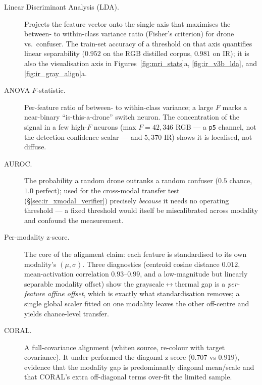 \documentclass[12pt,a4paper,oneside,openright]{book}
\begin{document}
\begin{description}
    \item[Linear Discriminant Analysis (LDA).] Projects the feature vector onto the single axis that maximises the between- to within-class variance ratio (Fisher's criterion) for drone vs.\ confuser. The train-set accuracy of a threshold on that axis quantifies linear separability ($0.952$ on the RGB distilled corpus, $0.981$ on IR); it is also the visualisation axis in Figures~\ref{fig:mri_stats}a, \ref{fig:ir_v3b_lda}, and \ref{fig:ir_gray_align}a.
    \item[ANOVA $F$-statistic.] Per-feature ratio of between- to within-class variance; a large $F$ marks a near-binary ``is-this-a-drone'' switch neuron. The concentration of the signal in a few high-$F$ neurons (max $F=42{,}346$ RGB --- a \texttt{p5} channel, not the detection-confidence scalar --- and $5{,}370$ IR) shows it is localised, not diffuse.
    \item[AUROC.] The probability a random drone outranks a random confuser ($0.5$ chance, $1.0$ perfect); used for the cross-modal transfer test (\S\ref{sec:ir_xmodal_verifier}) precisely \emph{because} it needs no operating threshold --- a fixed threshold would itself be miscalibrated across modality and confound the measurement.
    \item[Per-modality z-score.] The core of the alignment claim: each feature is standardised to its own modality's $(\mu,\sigma)$. Three diagnostics (centroid cosine distance $0.012$, mean-activation correlation $0.93$--$0.99$, and a low-magnitude but linearly separable modality offset) show the grayscale$\leftrightarrow$thermal gap is a \emph{per-feature affine offset}, which is exactly what standardisation removes; a single global scaler fitted on one modality leaves the other off-centre and yields chance-level transfer.
    \item[CORAL.] A full-covariance alignment (whiten source, re-colour with target covariance). It under-performed the diagonal z-score ($0.707$ vs $0.919$), evidence that the modality gap is predominantly diagonal mean/scale and that CORAL's extra off-diagonal terms over-fit the limited sample.
\end{description}
\end{document}
